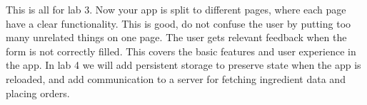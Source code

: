 \documentclass[fleqn, article, a4paper]{memoir}
\begin{document}
\begin{Assignments}
\item This is all for lab 3. Now your app is split to different pages, where each page have a clear functionality. This is good, do not confuse the user by putting too many unrelated things on one page. The user gets relevant feedback when the form is not correctly filled. This covers the basic features and user experience in the app. In lab 4 we will add persistent storage to preserve state when the app is reloaded, and add communication to a server for fetching ingredient data and placing orders.

\end{Assignments}


\end{document}
